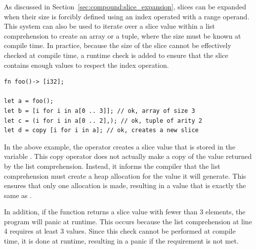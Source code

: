 As discussed in Section~\ref{sec:compound:slice_expansion}, slices can be expanded when
their size is forcibly defined using an index operated with a range operand.
This system can also be used to iterate over a slice value within a list
comprehension to create an array or a tuple, where the size must be known at
compile time. In practice, because the size of the slice cannot be effectively
checked at compile time, a runtime check is added to ensure that the slice
contains enough values to respect the index operation.

\begin{lstlisting}[style=coloredverbatim, label=lst:flow:list_compr_slice_to_array, caption=List comprehension over a slice with cte size]
fn foo()-> [i32];

let a = foo();
let b = [i for i in a[0 .. 3]]; // ok, array of size 3
let c = (i for i in a[0 .. 2],); // ok, tuple of arity 2
let d = copy [i for i in a]; // ok, creates a new slice
\end{lstlisting}

In the above example, the  operator creates a slice value
that is stored in the variable . This copy operator does not actually
make a copy of the value returned by the list comprehension. Instead, it informs
the compiler that the list comprehension must create a heap allocation for the
value it will generate. This ensures that only one allocation is made, resulting
in a value that is exactly the same as .

In addition, if the function  returns a slice value with fewer than 3
elements, the program will panic at runtime. This occurs because the list
comprehension at line 4 requires at least 3 values. Since this check cannot be
performed at compile time, it is done at runtime, resulting in a panic if the
requirement is not met.

\vfill%
\pagebreak
